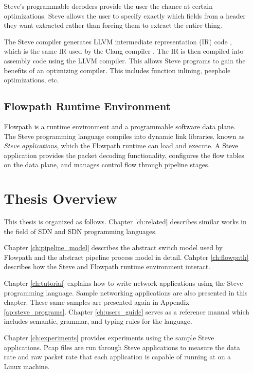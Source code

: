 Steve's programmable decoders provide the user the chance at certain
optimizations. Steve allows the user to specify exactly which fields from a
header they want extracted rather than forcing them to extract the entire thing.


The Steve compiler generates LLVM intermediate representation (IR) code
\cite{llvm_webpage}, which is the same IR used by the Clang compiler
\cite{clang_webpage}. The IR is then compiled into assembly code using the LLVM
compiler. This allows Steve programs to gain the benefits of an optimizing
compiler. This includes function inlining, peephole optimizations, etc.

\subsection{Flowpath Runtime Environment}

Flowpath is a runtime environment and a programmable software data plane. The
Steve programming language compiles into dynamic link libraries, known as
\emph{Steve applications}, which the Flowpath runtime can load and execute. A
Steve application provides the packet decoding functionality, configures the
flow tables on the data plane, and manages control flow through pipeline stages.

\section{Thesis Overview}

This thesis is organized as follows. Chapter \ref{ch:related} describes similar
works in the field of SDN and SDN programming languages.

Chapter \ref{ch:pipeline_model} describes the abstract switch model used by
Flowpath and the abstract pipeline process model in detail. Cahpter
\ref{ch:flowpath} describes how the Steve and Flowpath runtime environment
interact.

Chapter \ref{ch:tutorial} explains how to write network applications using the
Steve programming language. Sample networking applications are also presented in
this chapter. These same samples are presented again in Appendix
\ref{ap:steve_programs}. Chapter \ref{ch:users_guide} serves as a reference
manual which includes semantic, grammar, and typing rules for the language.

Chapter \ref{ch:experiments} provides experiments using the sample Steve
applications. Pcap files are run through Steve applications to measure the data
rate and raw packet rate that each application is capable of running at on a
Linux machine.
